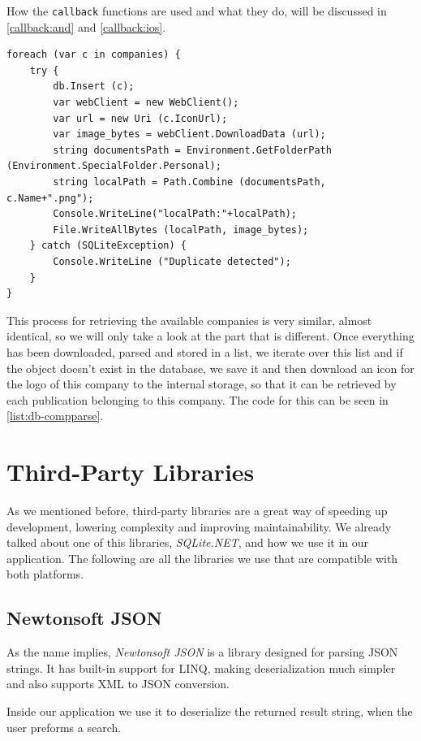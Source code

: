 How the \texttt{callback} functions are used and what they do, will be discussed in \autoref{callback:and} and \autoref{callback:ios}.

\begin{lstlisting}[frame=lt,caption=CompaniesParser.cs,label={list:db-compparse}]
foreach (var c in companies) {
	try {
		db.Insert (c);
		var webClient = new WebClient();
		var url = new Uri (c.IconUrl);
		var image_bytes = webClient.DownloadData (url);
		string documentsPath = Environment.GetFolderPath (Environment.SpecialFolder.Personal);	
		string localPath = Path.Combine (documentsPath, c.Name+".png");
		Console.WriteLine("localPath:"+localPath);
		File.WriteAllBytes (localPath, image_bytes);		
	} catch (SQLiteException) {
		Console.WriteLine ("Duplicate detected");					
	}
}
\end{lstlisting}

This process for retrieving the available companies is very similar, almost identical, so we will only take a look at the part that is different. Once everything has been downloaded, parsed and stored in a list, we iterate over this list and if the object doesn't exist in the database, we save it and then download an icon for the logo of this company to the internal storage, so that it can be retrieved by each publication belonging to this company. The code for this can be seen in \autoref{list:db-compparse}.

\section{Third-Party Libraries}

As we mentioned before, third-party libraries are a great way of speeding up development, lowering complexity and improving maintainability. We already talked about one of this libraries, \textit{SQLite.NET}, and how we use it in our application. The following are all the libraries we use that are compatible with both platforms. 

\subsection{Newtonsoft JSON}

As the name implies, \textit{Newtonsoft JSON} is a library designed for parsing \ac{JSON} strings. It has built-in support for \ac{LINQ}, making deserialization much simpler and also supports \ac{XML} to \ac{JSON} conversion.

Inside our application we use it to deserialize the returned result string, when the user preforms a search.

